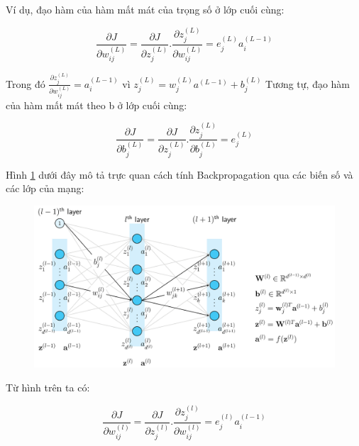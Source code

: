 Ví dụ, đạo hàm của hàm mất mát của trọng số ở lớp cuối cùng:
\begin{center}
	\begin{equation}
		\frac{\partial J}{\partial w_{ij}^{(L)}} = \frac{\partial J}{\partial z_j^{(L)}}.\frac{\partial z_j^{(L)}}{\partial w_{ij}^{(L)}} 
		= e_j^{(L)}a_i^{(L-1)}
	\end{equation}
\end{center}
Trong đó \(\frac{\partial z_j^{(L)}}{\partial w_{ij}^{(L)}} = a_i^{(L-1)}\) vì \(z_j^{(L)} = w_j^{(L)}a^{(L-1)}+b_j^{(L)}\)
Tương tự, đạo hàm của hàm mất mát theo b ở lớp cuối cùng:
\begin{center}
	\begin{equation}
		\frac{\partial J}{\partial b_{j}^{(L)}} = \frac{\partial J}{\partial z_j^{(L)}}.\frac{\partial z_j^{(L)}}{\partial b_{j}^{(L)}} 
		= e_j^{(L)}
	\end{equation}
\end{center}
Hình \ref{chap2:backpropagation} dưới đây mô tả trực quan cách tính Backpropagation qua các biến số và các lớp của mạng:
\begin{center}
    \begin{figure}[H]
    \centering
    \includegraphics[width=1\columnwidth]{images/chap2/backpropagation.png}
    \label{chap2:backpropagation}
    \end{figure}
\end{center}
Từ hình trên ta có:
\begin{center}
	\begin{equation}
		\frac{\partial J}{\partial w_{ij}^{(l)}} = \frac{\partial J}{\partial z_j^{(l)}}.\frac{\partial z_j^{(l)}}{\partial w_{ij}^{(l)}} 
		= e_j^{(l)}a_i^{(l-1)}
	\end{equation}
\end{center}
